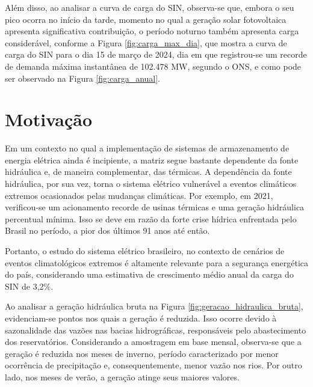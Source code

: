 Além disso, ao analisar a curva de carga do SIN, observa-se que, embora o seu pico ocorra no início da 
tarde, momento no qual a geração solar fotovoltaica apresenta significativa contribuição, o período noturno também 
apresenta carga considerável, conforme a Figura \ref{fig:carga_max_dia}, que mostra a curva de carga do SIN para o 
dia 15 de março de 2024, dia em que registrou-se um recorde de demanda máxima instantânea de 102.478 MW, segundo o ONS, 
e como pode ser observado na Figura \ref{fig:carga_anual}.

\begin{figure}[!ht]
	{}
	{}
\end{figure}

\section{Motivação}
Em um contexto no qual a implementação de sistemas de armazenamento de energia elétrica ainda é incipiente,
a matriz segue bastante dependente da fonte hidráulica e, de maneira complementar, das térmicas. A dependência da fonte
hidráulica, por sua vez, torna o sistema elétrico vulnerável a eventos climáticos extremos ocasionados pelas mudanças
climáticas. Por exemplo, em 2021, verificou-se um acionamento recorde de usinas térmicas e uma geração hidráulica 
percentual mínima. Isso se deve em razão da forte crise hídrica enfrentada pelo Brasil no período, a pior dos últimos 91 anos
até então. \cite{Soares2023}

\begin{figure}[!ht]
	{}
	{}
\end{figure}

Portanto, o estudo do sistema elétrico brasileiro, no contexto de cenários de eventos
climatológicos extremos é altamente relevante para a segurança energética do país, considerando uma estimativa de 
crescimento médio anual da carga do SIN de 3,2\%. \cite{pen2024}

Ao analisar a geração hidráulica bruta na Figura \ref{fig:geracao_hidraulica_bruta}, evidenciam-se pontos nos 
quais a geração é reduzida. Isso ocorre devido à sazonalidade das vazões nas bacias hidrográficas, responsáveis pelo 
abastecimento dos reservatórios. Considerando a amostragem em base mensal, observa-se que a geração é reduzida nos meses
de inverno, período caracterizado por menor ocorrência de precipitação e, consequentemente, menor vazão nos rios. Por
outro lado, nos meses de verão, a geração atinge seus maiores valores.

